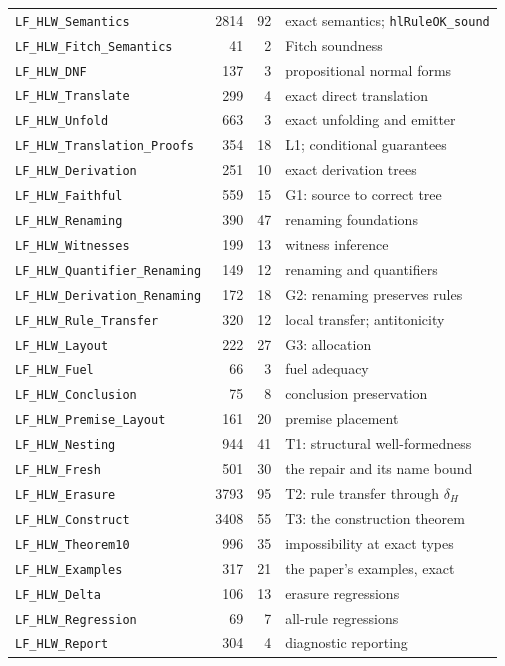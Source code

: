 \documentclass[11pt]{article}
\theoremstyle{plain}
\newcommand{\ubrk}{\_\discretionary{}{}{}}
\newcommand{\isa}[1]{\textup{\texttt{\small #1}}}
\newcommand{\thy}[1]{\textup{\texttt{\small #1}}}
\begin{document}
\begin{longtable}{@{}lrr l@{}}
\thy{LF\ubrk{}HLW\ubrk{}Semantics} & 2814 & 92 & exact semantics; \isa{hlRuleOK\ubrk{}sound} \\
\thy{LF\ubrk{}HLW\ubrk{}Fitch\ubrk{}Semantics} & 41 & 2 & Fitch soundness \\
\thy{LF\ubrk{}HLW\ubrk{}DNF} & 137 & 3 & propositional normal forms \\
\thy{LF\ubrk{}HLW\ubrk{}Translate} & 299 & 4 & exact direct translation \\
\thy{LF\ubrk{}HLW\ubrk{}Unfold} & 663 & 3 & exact unfolding and emitter \\
\thy{LF\ubrk{}HLW\ubrk{}Translation\ubrk{}Proofs} & 354 & 18 & L1; conditional guarantees \\
\thy{LF\ubrk{}HLW\ubrk{}Derivation} & 251 & 10 & exact derivation trees \\
\thy{LF\ubrk{}HLW\ubrk{}Faithful} & 559 & 15 & G1: source to correct tree \\
\thy{LF\ubrk{}HLW\ubrk{}Renaming} & 390 & 47 & renaming foundations \\
\thy{LF\ubrk{}HLW\ubrk{}Witnesses} & 199 & 13 & witness inference \\
\thy{LF\ubrk{}HLW\ubrk{}Quantifier\ubrk{}Renaming} & 149 & 12 & renaming and quantifiers \\
\thy{LF\ubrk{}HLW\ubrk{}Derivation\ubrk{}Renaming} & 172 & 18 & G2: renaming preserves rules \\
\thy{LF\ubrk{}HLW\ubrk{}Rule\ubrk{}Transfer} & 320 & 12 & local transfer; antitonicity \\
\thy{LF\ubrk{}HLW\ubrk{}Layout} & 222 & 27 & G3: allocation \\
\thy{LF\ubrk{}HLW\ubrk{}Fuel} & 66 & 3 & fuel adequacy \\
\thy{LF\ubrk{}HLW\ubrk{}Conclusion} & 75 & 8 & conclusion preservation \\
\thy{LF\ubrk{}HLW\ubrk{}Premise\ubrk{}Layout} & 161 & 20 & premise placement \\
\thy{LF\ubrk{}HLW\ubrk{}Nesting} & 944 & 41 & T1: structural well-formedness \\
\thy{LF\ubrk{}HLW\ubrk{}Fresh} & 501 & 30 & the repair and its name bound \\
\thy{LF\ubrk{}HLW\ubrk{}Erasure} & 3793 & 95 & T2: rule transfer through $\delta_H$ \\
\thy{LF\ubrk{}HLW\ubrk{}Construct} & 3408 & 55 & T3: the construction theorem \\
\thy{LF\ubrk{}HLW\ubrk{}Theorem10} & 996 & 35 & impossibility at exact types \\
\thy{LF\ubrk{}HLW\ubrk{}Examples} & 317 & 21 & the paper's examples, exact \\
\thy{LF\ubrk{}HLW\ubrk{}Delta} & 106 & 13 & erasure regressions \\
\thy{LF\ubrk{}HLW\ubrk{}Regression} & 69 & 7 & all-rule regressions \\
\thy{LF\ubrk{}HLW\ubrk{}Report} & 304 & 4 & diagnostic reporting \\
\bottomrule
\end{longtable}
\end{document}
